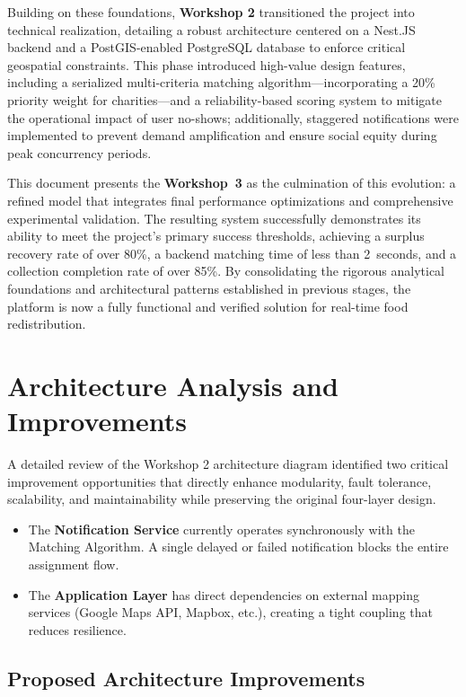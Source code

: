 \documentclass[9pt,conference]{IEEEtran}
\begin{document}
Building on these foundations, \textbf{Workshop 2} transitioned the project into technical realization, detailing a robust architecture centered on a Nest.JS backend and a PostGIS-enabled PostgreSQL database to enforce critical geospatial constraints. This phase introduced high-value design features, including a serialized multi-criteria matching algorithm—incorporating a 20\% priority weight for charities—and a reliability-based scoring system to mitigate the operational impact of user no-shows; additionally, staggered notifications were implemented to prevent demand amplification and ensure social equity during peak concurrency periods.

This document presents the \textbf{Workshop~3} as the culmination of this evolution: a refined model that integrates final performance optimizations and comprehensive experimental validation. The resulting system successfully demonstrates its ability to meet the project's primary success thresholds, achieving a surplus recovery rate of over 80\%, a backend matching time of less than 2~seconds, and a collection completion rate of over 85\%. By consolidating the rigorous analytical foundations and architectural patterns established in previous stages, the platform is now a fully functional and verified solution for real-time food redistribution.

\section{Architecture Analysis and Improvements}
A detailed review of the Workshop 2 architecture diagram identified two critical improvement opportunities that directly enhance modularity, fault tolerance, scalability, and maintainability while preserving the original four-layer design.

\begin{itemize}
    \item The \textbf{Notification Service} currently operates synchronously with the Matching Algorithm. A single delayed or failed notification blocks the entire assignment flow.  
    \item The \textbf{Application Layer} has direct dependencies on external mapping services (Google Maps API, Mapbox, etc.), creating a tight coupling that reduces resilience.
\end{itemize}

\subsection{Proposed Architecture Improvements}
\end{document}

